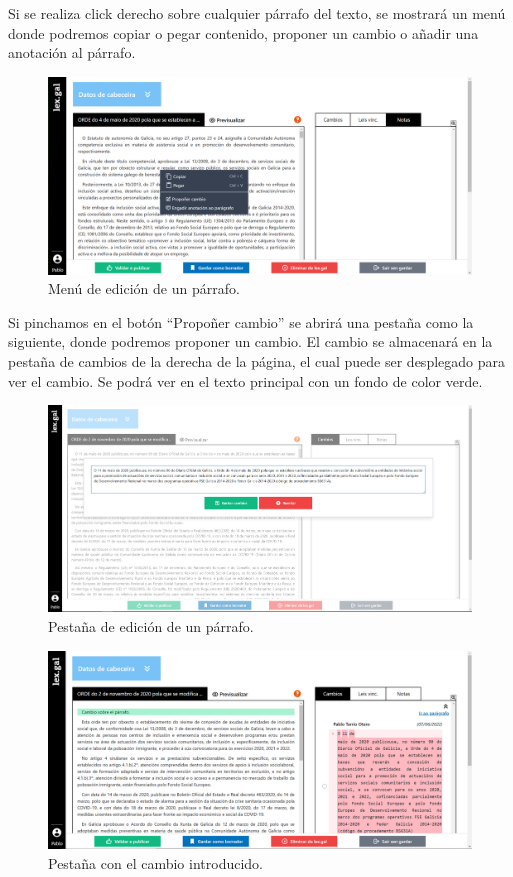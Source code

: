 Si se realiza click derecho sobre cualquier párrafo del texto, se mostrará un menú donde podremos copiar o pegar contenido, proponer un cambio o añadir una anotación al párrafo.

\begin{figure}[H]
\centerline{\includegraphics[width=12cm]{figuras/manualUsuario/EditarContextMenu.PNG}}
\caption{Menú de edición de un párrafo.}
\label{enlaceContextMenuLexGal}
\end{figure}

Si pinchamos en el botón ``Propoñer cambio'' se abrirá una pestaña como la siguiente, donde podremos proponer un cambio. El cambio se almacenará en la pestaña de cambios de la derecha de la página, el cual puede ser desplegado para ver el cambio. Se podrá ver en el texto principal con un fondo de color verde.

\begin{figure}[H]
\centerline{\includegraphics[width=12cm]{figuras/manualUsuario/Cambios.PNG}}
\caption{Pestaña de edición de un párrafo.}
\label{enlaceCambios}
\end{figure}

\begin{figure}[H]
\centerline{\includegraphics[width=15cm]{figuras/manualUsuario/PestanaCambios.PNG}}
\caption{Pestaña con el cambio introducido.}
\label{enlacePestanaCambios}
\end{figure}

